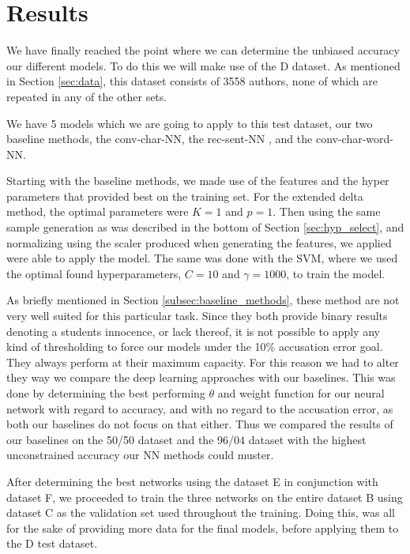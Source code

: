 \section{Results} \label{sec:results}

We have finally reached the point where we can determine the unbiased accuracy
our different models. To do this we will make use of the \gls{D} dataset. As
mentioned in Section \ref{sec:data}, this dataset consists of 3558 authors, none
of which are repeated in any of the other sets.

We have 5 models which we are going to apply to this test dataset, our
two baseline methods, the \gls{conv-char-NN}, the \gls{rec-sent-NN} , and the
\gls{conv-char-word-NN}.

Starting with the baseline methods, we made use of the features and the
hyper parameters that provided best on the training set. For the extended
delta method, the optimal parameters were $K=1$ and $p = 1$. Then using
the same sample generation as was described in the bottom of Section
\ref{sec:hyp_select}, and normalizing using the scaler produced when generating
the features, we applied were able to apply the model. The same was done with
the \gls{SVM}, where we used the optimal found hyperparameters, $C=10$ and
$\gamma = 1000$, to train the model.

As briefly mentioned in Section \ref{subsec:baseline_methods}, these method are
not very well suited for this particular task. Since they both provide binary
results denoting a students innocence, or lack thereof, it is not possible to
apply any kind of thresholding to force our models under the 10\% accusation
error goal. They always perform at their maximum capacity. For this reason
we had to alter they way we compare the deep learning approaches with our
baselines. This was done by determining the best performing $\theta$ and weight
function for our neural network with regard to accuracy, and with no regard to
the accusation error, as both our baselines do not focus on that either. Thus we
compared the results of our baselines on the 50/50 dataset and the 96/04 dataset
with the highest unconstrained accuracy our \gls{NN} methods could muster.

After determining the best networks using the dataset \gls{E} in conjunction
with dataset \gls{F}, we proceeded to train the three networks on the entire
dataset \gls{B} using dataset \gls{C} as the validation set used throughout the
training. Doing this, was all for the sake of providing more data for the final
models, before applying them to the \gls{D} test dataset.

